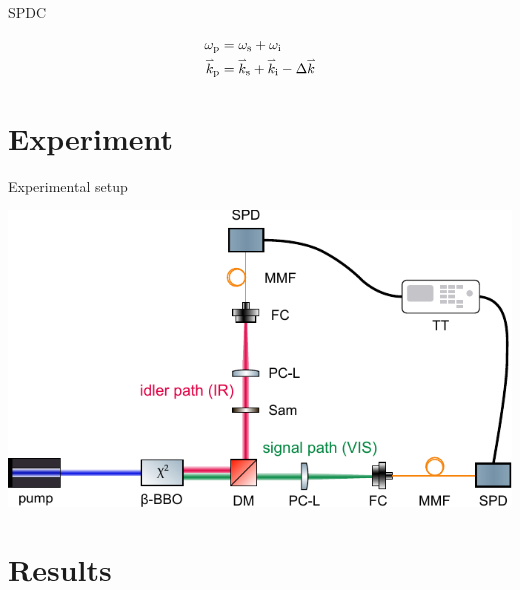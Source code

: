 \documentclass[10pt,aspectratio=43]{beamer}
\newcommand{\myvect}[1]{\accentset{\rightharpoonup}{#1}}
\begin{document}
\begin{frame}{SPDC}
\begin{figure}[!bt]
{
			}%
		\end{figure}
		\begin{equation}
			\begin{aligned}
				\omega_{\text{p}} &= \omega_{\text{s}} + \omega_{\text{i}} \\
				\myvect{k}_{\text{p}} &= \myvect{k}_{\text{s}} + \myvect{k}_{\text{i}} - \Delta \myvect{k}
			\end{aligned}
		\end{equation} 
	\end{frame}
	
	\section{Experiment}
	\begin{frame}{Experimental setup}
			\begin{center}
				\includegraphics[width=.7\textwidth]{Images/DupishSetup.pdf}
			\end{center}
			
	\end{frame}
	\section{Results}
	
	
	
\end{document}
